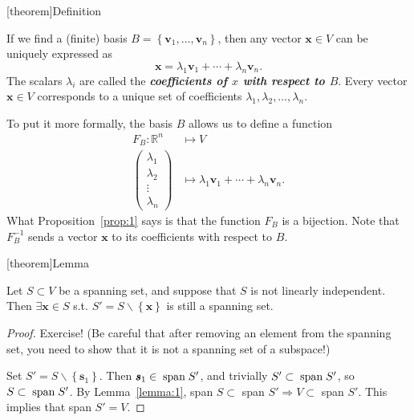 \documentclass[12pt]{report}
\theoremstyle{definition}
\begin{document}
[theorem]{Definition}
\begin{coefficients of x with respect to B}
    If we find a (finite) basis $B = \left\{\pmb{v}_1,\ldots,\pmb{v}_n\right\} $,
    then any vector $\pmb{x} \in V$ can be uniquely expressed as\[
        \pmb{x} = \lambda_1 \pmb{v}_1 + \cdots + \lambda_n \pmb{v}_n.
    \]The scalars $\lambda_i$ are called the \textbf{\emph{coefficients of $x$ with respect to $B$}}.
    Every vector $\pmb{x}\in V$ corresponds to a unique set of coefficients
    $\lambda_1, \lambda_2, \ldots, \lambda_n$.
\end{coefficients of x with respect to B}
To put it more formally, the basis $B$ allows us to define a function\[
    \begin{align*}
        F_B:\mathbb{R}^{n} & \mapsto V \\
        \begin{pmatrix}
                \lambda_1 \\
                \lambda_2 \\
                \vdots \\
                \lambda_n
            \end{pmatrix} & \mapsto \lambda_1 \pmb{v}_1 + \cdots + \lambda_n \pmb{v}_n.
    \end{align*}
\]
What Proposition~\ref{prop:1} says is that the function $F_B$ is a bijection.
Note that $F_B^{-1}$ sends a vector $\pmb{x}$ to its coefficients with respect to $B$.

[theorem]{Lemma}
\begin{linearly dependent spanning set removed an element to be linearly independent}
    Let $S \subset V$ be a spanning set, and suppose that $S$ is not linearly independent.
    Then $\exists \pmb{x}\in S$ s.t. $S' = S\backslash\left\{\pmb{x}\right\} $ is still a spanning set.
\end{linearly dependent spanning set removed an element to be linearly independent}

\begin{proof}
    Exercise!
    (Be careful that after removing an element from the spanning set,
    you need to show that it is not a spanning set of a subspace!)
    
    Set $S' = S \backslash\left\{\pmb{s}_1\right\} $. Then $\pmb{s}_1 \in \;\textnormal{span}\;{S'}$,
    and trivially $S' \subset \;\textnormal{span}\;{S'}$, so $S \subset \;\textnormal{span}\;{S'}$.
    By Lemma~\ref{lemma:1}, span $S \subset$ span $S' \Rightarrow{} V \subset$ span $S'$.
    This implies that span $S' = V$.
\end{proof}
\end{document}
